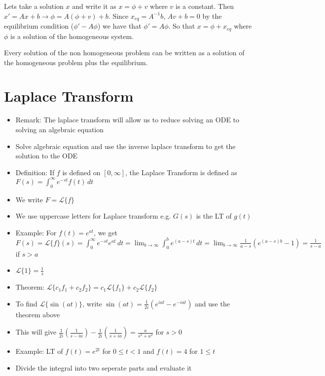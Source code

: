 \documentclass[12pt]{article}
\begin{document}
Lets take a solution $x$ and write it as $x = \phi + v$ where $v$ is a constant. Then $x' = Ax + b \rightarrow \phi = A(\phi + v) + b$. Since $x_{eq} = A^{-1}b$, $Av+b =0$ by the equilibrium condition ($\phi' - A \phi$) we have that $\phi' = A \phi$. So that $x = \phi + x_{eq}$ where $\phi$ is a solution of the homogeneous system. 

Every solution of the non homogeneous problem can be written as a solution of the homogeneous problem plus the equilibrium. 

\section{Laplace Transform}

\begin{itemize}
    \item Remark: The laplace transform will allow us to reduce solving an ODE to solving an algebraic equation
    \item Solve algebraic equation and use the inverse laplace transform to get the solution to the ODE
    \item Definition: If $f$ is defined on $[0, \infty]$, the Laplace Transform is defined as $F(s) = \int_{0}^{\infty} e^{-st} f(t) \, dt$
    \item We write $F = \mathcal{L} \{f\}$
    \item We use uppercase letters for Laplace transform e.g. $G(s)$ is the LT of $g(t)$
    \item Example: For $f(t) = e^{at}$, we get $F(s) = \mathcal{L}\{f\}(s) = \int_{0}^{\infty} e^{-st} e^{at} \, dt = \lim_{b\rightarrow \infty} \int_{0}^{b} e^{(a-s)t} \, dt = \lim_{b\rightarrow \infty} \frac{1}{a-s} \left( e^{(a-s)b} - 1 \right) = \frac{1}{s-a}$ if $s > a$
    \item $\mathcal{L} \{1\} = \frac{1}{s}$
    \item Theorem: $\mathcal{L} \{c_1f_1 + c_2f_2\} = c_1 \mathcal{L} \{f_1\} + c_2 \mathcal{L} \{f_2\}$
    \item To find $\mathcal{L} \{\sin(at)\}$, write $\sin(at) = \frac{1}{2i} (e^{iat} - e^{-iat})$ and use the theorem above
    \item This will give $\frac{1}{2i} \left(\frac{1}{s - ia}\right) - \frac{1}{2i} \left(\frac{1}{s+ia}\right) = \frac{a}{s^2 + a^2}$ for $s > 0$
    \item Example: LT of $f(t) = e^{2t}$ for $0 \leq t < 1$ and $f(t) = 4$ for $1 \leq t$
    \item Divide the integral into two seperate parts and evaluate it

\end{itemize}
\end{document}
